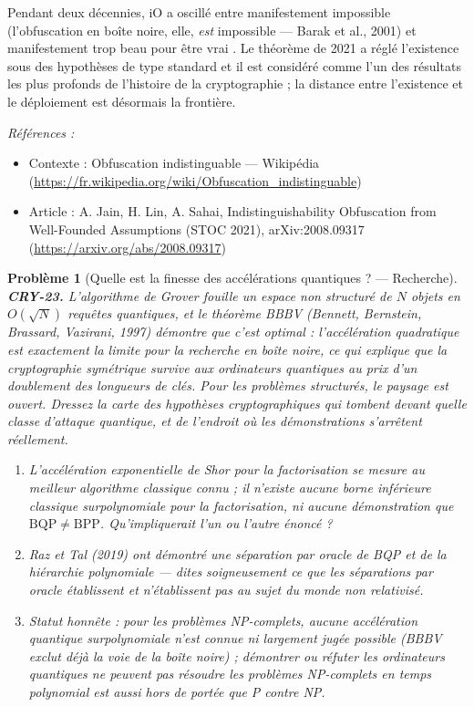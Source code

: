 \documentclass[11pt]{article}
\newtheorem{problem}{Problème}
\newenvironment{refs}{\par\small\noindent\emph{Références :}\begin{itemize}\setlength\itemsep{0pt}}{\end{itemize}\normalsize}
\begin{document}
\noindent Pendant deux décennies, iO a oscillé entre \og{} manifestement impossible \fg{}
(l'obfuscation en boîte noire, elle, \textit{est} impossible --- Barak et al., 2001) et
\og{} manifestement trop beau pour être vrai \fg{}. Le théorème de 2021 a réglé l'existence sous des
hypothèses de type standard et il est considéré comme l'un des résultats les plus profonds de
l'histoire de la cryptographie ; la distance entre l'existence et le déploiement est
désormais la frontière.

\begin{refs}
\item Contexte : Obfuscation indistinguable --- Wikipédia (\url{https://fr.wikipedia.org/wiki/Obfuscation_indistinguable})
\item Article : A. Jain, H. Lin, A. Sahai, \og{} Indistinguishability Obfuscation from Well-Founded Assumptions \fg{} (STOC 2021), arXiv:2008.09317 (\url{https://arxiv.org/abs/2008.09317})
\end{refs}

\bigskip

\begin{problem}[{Quelle est la finesse des accélérations quantiques ? --- Recherche}]
\textbf{CRY-23.} L'algorithme de Grover fouille un espace non
structuré de $N$ objets en $O(\sqrt N)$ requêtes quantiques, et le théorème BBBV
(Bennett, Bernstein, Brassard, Vazirani, 1997) démontre que c'est optimal : l'accélération
quadratique est \textit{exactement} la limite pour la recherche en boîte noire, ce qui explique
que la cryptographie symétrique survive aux ordinateurs quantiques au prix d'un doublement des
longueurs de clés. Pour les problèmes structurés, le paysage est ouvert. Dressez la carte des
hypothèses cryptographiques qui tombent devant quelle classe d'attaque quantique, et de
l'endroit où les démonstrations s'arrêtent réellement.
\begin{enumerate}
\item[(a)] L'accélération exponentielle de Shor pour la factorisation se
mesure au meilleur algorithme classique \textit{connu} ; il n'existe aucune borne inférieure
classique surpolynomiale pour la factorisation, ni aucune démonstration que
$\mathrm{BQP} \ne \mathrm{BPP}$. Qu'impliquerait l'un ou l'autre énoncé ?
\item[(b)] Raz et
Tal (2019) ont démontré une séparation par oracle de BQP et de la hiérarchie polynomiale ---
dites soigneusement ce que les séparations par oracle établissent et n'établissent pas au
sujet du monde non relativisé.
\item[(c)] Statut honnête : pour les problèmes NP-complets, aucune
accélération quantique surpolynomiale n'est connue ni largement jugée possible (BBBV exclut
déjà la voie de la boîte noire) ; démontrer ou réfuter \og{} les ordinateurs quantiques ne
peuvent pas résoudre les problèmes NP-complets en temps polynomial \fg{} est aussi hors de portée
que P contre NP.
\end{enumerate}

\end{problem}
\end{document}

